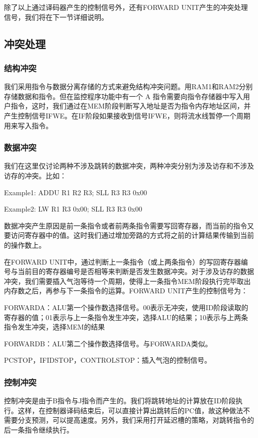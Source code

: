除了以上通过译码器产生的控制信号外，还有FORWARD UNIT产生的冲突处理信号，我们将在下一节详细说明。

\subsection{冲突处理}
\subsubsection{结构冲突}
我们采用指令与数据分离存储的方式来避免结构冲突问题。用RAM1和RAM2分别存储数据和指令。但在监控程序功能中有一个 A 指令需要向指令存储器中写入用户指令，这时，我们通过在MEM阶段判断写入地址是否为指令内存地址区间，并产生控制信号IFWE。在IF阶段如果接收到信号IFWE，则将流水线暂停一个周期用来写入指令。

\subsubsection{数据冲突}
我们在这里仅讨论两种不涉及跳转的数据冲突，两种冲突分别为涉及访存和不涉及访存的冲突。比如：

Example1: ADDU R1 R2 R3; SLL R3 R3 0x00

Example2: LW R1 R3 0x00; SLL R3 R3 0x00

数据冲突产生原因是前一条指令或者前两条指令需要写回寄存器，而当前的指令又要访问寄存器中的值。这时我们通过增加旁路的方式将之前的计算结果传输到当前的操作数上。

在FORWARD UNIT中，通过判断上一条指令（或上两条指令）的写回寄存器编号与当前目的寄存器编号是否相等来判断是否发生数据冲突。对于涉及访存的数据冲突，我们需要插入气泡等待一个周期，使得上一条指令MEM阶段执行完毕取出内存数之后，再参与下一条指令的运算。FORWARD UNIT产生的控制信号为：

FORWARDA：ALU第一个操作数选择信号。00表示无冲突，使用ID阶段读取的寄存器的值；01表示与上一条指令发生冲突，选择ALU的结果；10表示与上两条指令发生冲突，选择MEM的结果

FORWARDB：ALU第二个操作数选择信号。与FORWARDA类似。

PCSTOP，IFIDSTOP，CONTROLSTOP：插入气泡的控制信号。

\subsubsection{控制冲突}

控制冲突是由于B指令与J指令而产生的。我们将跳转地址的计算放在ID阶段执行。这样，在控制器译码结束后，可以直接计算出跳转后的PC值，故这种做法不需要分支预测，可以提高速度。另外，我们采用打开延迟槽的策略，对跳转指令的后一条指令继续执行。

